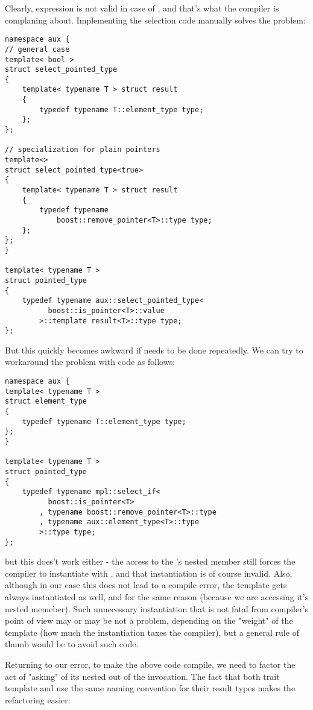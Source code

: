 \documentclass{netobjectdays}
\begin{document}
Clearly,  expression is not 
valid in case of , and that's what the 
compiler is complaning about. Implementing the selection code 
manually solves the problem: 

{\footnotesize
\begin{verbatim}
namespace aux {
// general case
template< bool >
struct select_pointed_type
{
    template< typename T > struct result
    {
        typedef typename T::element_type type;
    };
};

// specialization for plain pointers
template<>
struct select_pointed_type<true>
{
    template< typename T > struct result
    {
        typedef typename
            boost::remove_pointer<T>::type type;
    };
};
}

template< typename T >
struct pointed_type
{
    typedef typename aux::select_pointed_type<
          boost::is_pointer<T>::value
        >::template result<T>::type type;
};
\end{verbatim}
}

But this quickly becomes awkward if needs to be done 
repeatedly. We can try to workaround the problem with 
 code as follows:

{\footnotesize
\begin{verbatim}
namespace aux {
template< typename T >
struct element_type
{
	typedef typename T::element_type type;
};
}

template< typename T >
struct pointed_type
{
    typedef typename mpl::select_if<
          boost::is_pointer<T>
        , typename boost::remove_pointer<T>::type
        , typename aux::element_type<T>::type
        >::type type;
};
\end{verbatim}
}

but this does't work either - the access to the 
's nested  member still 
forces the compiler to instantiate 
with , and that instantiation is of course 
invalid. Also, although in our case this does not lead to a 
compile error, the  template 
gets always instantiated as well, and for the same reason 
(because we are accessing it's nested  memeber). 
Such unnecessary instantiation that is not fatal from 
compiler's point of view may or may be not a problem, 
depending on the "weight" of the template (how much the 
instantiation taxes the compiler), but a general rule of 
thumb would be to avoid such code.

Returning to our error, to make the above code compile, we 
need to factor the act of "asking" 
of its nested  out of the  
invocation. The fact that both 
trait template and  use the same 
naming convention for their result types makes the refactoring 
easier:
\end{document}
